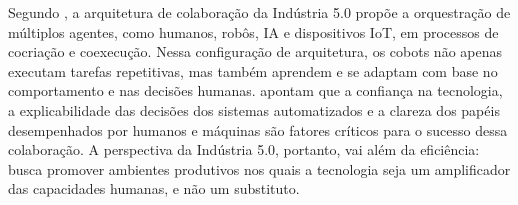 Segundo , a arquitetura de colaboração da Indústria 5.0 propõe a orquestração de múltiplos agentes, como humanos, robôs, \gls{IA} e dispositivos \gls{IoT}, em processos de cocriação e coexecução. Nessa configuração de arquitetura, os cobots não apenas executam tarefas repetitivas, mas também aprendem e se adaptam com base no comportamento e nas decisões humanas.  apontam que a confiança na tecnologia, a explicabilidade das decisões dos sistemas automatizados e a clareza dos papéis desempenhados por humanos e máquinas são fatores críticos para o sucesso dessa colaboração. A perspectiva da Indústria 5.0, portanto, vai além da eficiência: busca promover ambientes produtivos nos quais a tecnologia seja um amplificador das capacidades humanas, e não um substituto.


